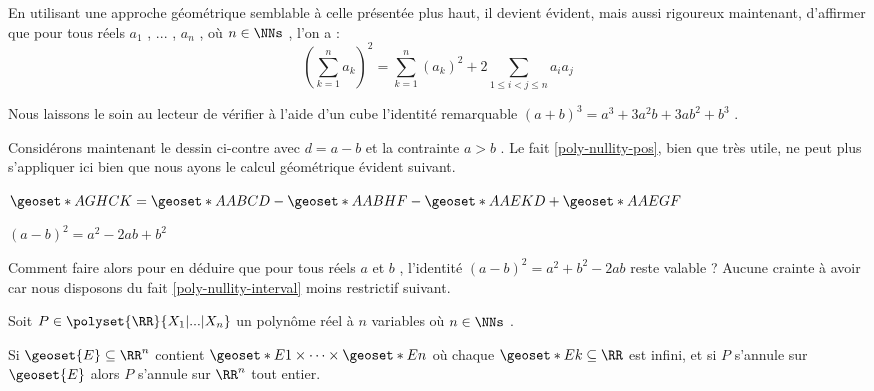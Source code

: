 

\begin{example}
	En utilisant une approche géométrique semblable à celle présentée plus haut, il devient évident, mais aussi rigoureux maintenant, d'affirmer que pour tous réels $a_1$ , ... , $a_n$ , où $n \in \NNs$ , l'on a :
\[
	\left( \sum_{k=1}^{n}a_k \right)^2
	=
	\sum_{k=1}^{n} \left( a_k \right)^2
	+
	2 \sum_{1 \leq i < j \leq n} a_i a_j
\]
\end{example}




\begin{example}
	Nous laissons le soin au lecteur de vérifier à l'aide d'un cube l'identité remarquable $(a + b)^3 = a^3 + 3 a^2 b + 3 a b^2 + b^3$ .
\end{example}




\medskip


\begin{figure} 
	\vspace{-.5em}
	\begin{center}
	\end{center}
	\vspace{-1.25em}
\end{figure} 


Considérons maintenant le dessin ci-contre avec $d = a - b$ et la contrainte $a > b$ . Le fait \ref{poly-nullity-pos}, bien que très utile, ne peut plus s'appliquer ici bien que nous ayons le calcul géométrique évident suivant.

\smallskip

$\geoset*{A}{GHCK} = \geoset*{A}{ABCD} - \geoset*{A}{ABHF} - \geoset*{A}{AEKD} + \geoset*{A}{AEGF}$
	
\smallskip
	
$(a-b)^2 = a^2 - 2ab + b^2$


\medskip

Comment faire alors pour en déduire que pour tous réels $a$ et $b$ , l'identité $(a - b)^2 = a^2 + b^2 - 2ab$ reste valable ?
Aucune crainte à avoir car nous disposons du fait \ref{poly-nullity-interval} moins restrictif suivant. 


\begin{fact} \label{poly-nullity-interval}
	Soit $P \in \polyset{\RR}{X_1 | ... | X_n}$ un polynôme réel à $n$ variables où $n \in \NNs$ .
	
	\smallskip
	
	Si $\geoset{E} \subseteq \RR^n$ contient $\geoset*{E}{1} \times \cdots \times \geoset*{E}{n}$ où chaque $\geoset*{E}{k} \subseteq \RR$ est infini,
	et si $P$ s'annule sur $\geoset{E}$ alors $P$ s'annule sur $\RR^n$ tout entier. 
\end{fact}



